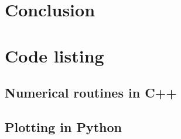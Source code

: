 \documentclass[11pt]{article}
\begin{document}
\section{Conclusion}\label{sec:conclusion}

\printbibliography{}
\pagebreak

\appendix
\section{Code listing}
\subsection{Numerical routines in C++}







\subsection{Plotting in Python}
\end{document}
